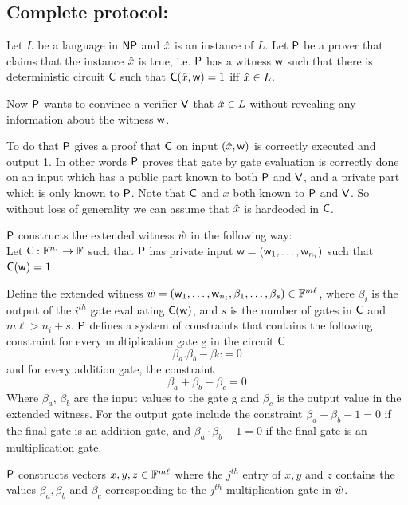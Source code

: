 \subsection{\textbf{Complete protocol:}}\label{completeprotocol} Let $L$ be a language in $\mathsf{NP}$ and $\hat{x}$ is an instance of $L$. Let $\mathsf{P}$ be a prover that claims that the instance $\hat{x}$ is true, i.e. $\mathsf{P}$ has a witness $\mathsf{w}$ such that there is deterministic circuit $\mathsf{C}$ such that $\mathsf{C}(\hat{x},\mathsf{w})=1$ iff $\hat{x} \in L$. 

Now $\mathsf{P}$ wants to convince a verifier $\mathsf{V}$ that $\hat{x}\in L$ without revealing any information about the witness $\mathsf{w}$. 

To do that $\mathsf{P}$ gives a proof that $\mathsf{C}$ on input $(\hat{x}, \mathsf{w})$ is correctly executed and output 1. In other words $\mathsf{P}$ proves that gate by gate evaluation is correctly done on an input which has a public part known to both $\mathsf{P}$ and $\mathsf{V}$, and a private part which is only known to $\mathsf{P}$. 
Note that $\mathsf{C}$ and $x$ both known to $\mathsf{P}$ and $\mathsf{V}$. So without loss of generality we can assume that $\hat{x}$ is hardcoded in $\mathsf{C}$.

$\mathsf{P}$ constructs the extended witness $\hat{w}$ in the following way: \\
Let $\mathsf{C}:\mathbb{F}^{n_i}\rightarrow \mathbb{F}$ such that $\mathsf{P}$ has private input $\mathsf{w} = (\mathsf{w}_1,\ldots, \mathsf{w}_{n_i})$ such that $\mathsf{C}(\mathsf{w})=1$.

Define the extended witness $\hat{w} = (\mathsf{w}_1,\ldots,\mathsf{w}_{n_i}, \beta_1,\ldots, \beta_s) \in \mathbb{F}^{m\ell}$, where $\beta_i$ is the output of the $i^{th}$ gate evaluating $\mathsf{C}(\mathsf{w})$, and $s$ is the number of gates in $\mathsf{C}$ and $m\ell>n_i + s$. $\mathsf{P}$ defines a system of constraints that contains the following constraint for every multiplication gate g in the circuit $\mathsf{C}$ $$\beta_{a}.\beta_{b}-\beta{c}=0$$
and for every addition gate, the constraint 
$$\beta_a + \beta_b - \beta_c = 0$$
Where $\beta_a$, $\beta_b$ are the input values to the gate g and $\beta_c$ is the output value in the extended witness. For the output gate include the constraint $\beta_a + \beta_b - 1 = 0$ if the final gate is an addition gate, and $\beta_a\cdot \beta_b - 1 = 0$ if the final gate is an multiplication gate. 

$\mathsf{P}$ constructs vectors $x,y,z \in \mathbb{F}^{m\ell}$ where the $j^{th}$ entry of $x,y$ and $z$ contains the values $\beta_a, \beta_b$ and $\beta_c$ corresponding to the $j^{th}$ multiplication gate in $\hat{w}$.

